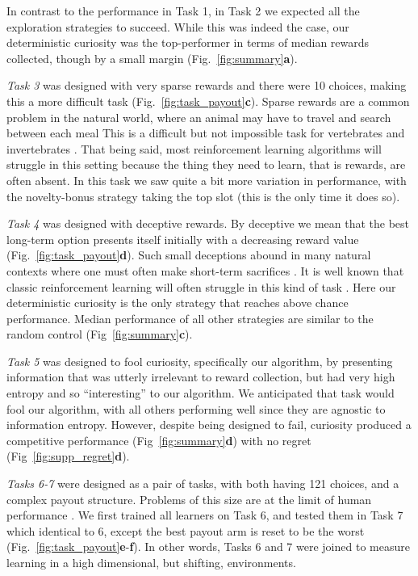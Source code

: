 In contrast to the performance in Task 1, in Task 2 we expected all the exploration strategies to succeed. While this was indeed the case, our deterministic curiosity was the top-performer in terms of median rewards collected, though by a small margin (Fig.~\ref{fig:summary}\textbf{a}).

\textit{Task 3} was designed with very sparse rewards \cite{Silver2016b,Silver2018} and there were 10 choices, making this a more difficult task (Fig.~\ref{fig:task_payout}\textbf{c}). Sparse rewards are a common problem in the natural world, where an animal may have to travel and search between each meal This is a difficult but not impossible task for vertebrates \cite{anderson1984optimal} and invertebrates \cite{westphal2006foraging}. That being said, most reinforcement learning algorithms will struggle in this setting because the thing they need to learn, that is rewards, are often absent. In this task we saw quite a bit more variation in performance, with the novelty-bonus strategy taking the top slot (this is the only time it does so).

\textit{Task 4} was designed with deceptive rewards. By deceptive we mean that the best long-term option presents itself initially with a decreasing reward value (Fig.~\ref{fig:task_payout}\textbf{d}). Such small deceptions abound in many natural contexts where one must often make short-term sacrifices \cite{internicola2012bumble}. It is well known that classic reinforcement learning will often struggle in this kind of task \cite{Lehman2011a,Sutton2018}. Here our deterministic curiosity is the only strategy that reaches above chance performance. Median performance of all other strategies are similar to the random control (Fig~\ref{fig:summary}\textbf{c}). 

\textit{Task 5} was designed to fool curiosity, specifically our algorithm, by presenting information that was utterly irrelevant to reward collection, but had very high entropy and so ``interesting'' to our algorithm. We anticipated that task would fool our algorithm, with all others performing well since they are agnostic to information entropy. However, despite being designed to fail,  curiosity produced a competitive performance (Fig~\ref{fig:summary}\textbf{d}) with no regret (Fig~\ref{fig:supp_regret}\textbf{d}).

\textit{Tasks 6-7} were designed as a pair of tasks, with both having 121 choices, and a complex payout structure. Problems of this size are at the limit of human performance \cite{Wu2018}. We first trained all learners on Task 6, and tested them in Task 7 which identical to 6, except the best payout arm is reset to be the worst (Fig.~\ref{fig:task_payout}\textbf{e}-\textbf{f}). In other words, Tasks 6 and 7 were joined to measure learning in a high dimensional, but shifting, environments.

